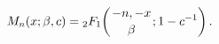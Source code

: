 \[\mathop{M_{n}\/}\nolimits\!\left(x;\beta,c\right)=\mathop{{{}_{2}F_{1}}\/}%
\nolimits\!\left({-n,-x\atop\beta};1-c^{-1}\right).\]